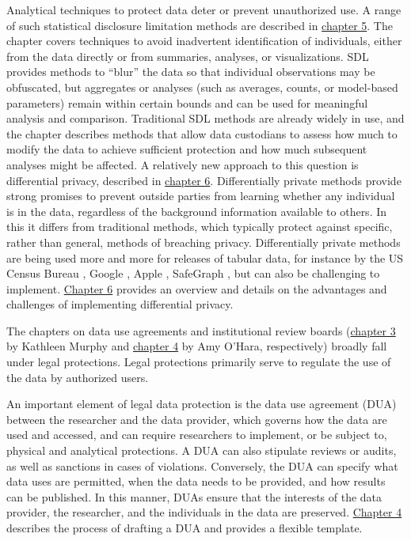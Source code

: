 Analytical techniques to protect data deter or prevent unauthorized use. A range of such statistical disclosure limitation methods are described in \protect\hyperlink{discavoid}{chapter 5}. The chapter covers techniques to avoid inadvertent identification of individuals, either from the data directly or from summaries, analyses, or visualizations. SDL provides methods to ``blur'' the data so that individual observations may be obfuscated, but aggregates or analyses (such as averages, counts, or model-based parameters) remain within certain bounds and can be used for meaningful analysis and comparison. Traditional SDL methods are already widely in use, and the chapter describes methods that allow data custodians to assess how much to modify the data to achieve sufficient protection and how much subsequent analyses might be affected. A relatively new approach to this question is differential privacy, described in \protect\hyperlink{diffpriv}{chapter 6}. Differentially private methods provide strong promises to prevent outside parties from learning whether any individual is in the data, regardless of the background information available to others. In this it differs from traditional methods, which typically protect against specific, rather than general, methods of breaching privacy. Differentially private methods are being used more and more for releases of tabular data, for instance by the US Census Bureau \citep{machanavajjhala2008}, Google \citep{erlingsson2014}, Apple \citep{differentialprivacyteam2017}, SafeGraph \citep{safegraph2020}, but can also be challenging to implement. \protect\hyperlink{diffpriv}{Chapter 6} provides an overview and details on the advantages and challenges of implementing differential privacy.

The chapters on data use agreements and institutional review boards (\protect\hyperlink{irb}{chapter 3} by Kathleen Murphy and \protect\hyperlink{dua}{chapter 4} by Amy O'Hara, respectively) broadly fall under legal protections. Legal protections primarily serve to regulate the use of the data by authorized users.

An important element of legal data protection is the data use agreement (DUA) between the researcher and the data provider, which governs how the data are used and accessed, and can require researchers to implement, or be subject to, physical and analytical protections. A DUA can also stipulate reviews or audits, as well as sanctions in cases of violations. Conversely, the DUA can specify what data uses are permitted, when the data needs to be provided, and how results can be published. In this manner, DUAs ensure that the interests of the data provider, the researcher, and the individuals in the data are preserved. \protect\hyperlink{dua}{Chapter 4} describes the process of drafting a DUA and provides a flexible template.

